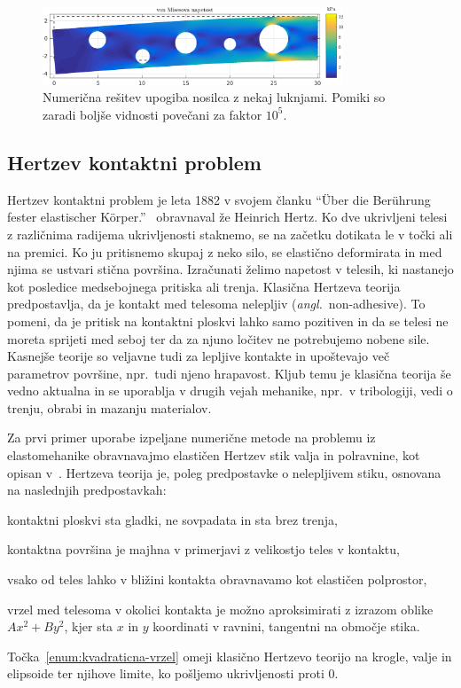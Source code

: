 \documentclass[12pt,a4paper,twoside]{article}
\newenvironment{enumerate*}{\vspace{-1.5\parskip}\begin{enumerate}\setlength{\itemsep}{0pt}\setlength{\parskip}{2pt}}{\end{enumerate}\vspace{-1\parskip}}
\theoremstyle{definition} %
\theoremstyle{plain} %
\numberwithin{equation}{section}
\newcommand{\ang}[1]{(\textit{angl.}\ #1)}
\begin{document}
\begin{figure}[h]
  \centering
  \includegraphics[width=0.8\textwidth]{images/cantilever_beam_with_holes.png}
  \caption[Numerična rešitev upogiba nosilca z nekaj luknjami.]{Numerična
  rešitev upogiba nosilca z nekaj luknjami. Pomiki so zaradi boljše vidnosti
  povečani za faktor $10^5$.}
  \label{fig:cantilever-beam-with-holes}
\end{figure}

\subsection{Hertzev kontaktni problem}
\label{sec:hertz}
Hertzev kontaktni problem je leta 1882 v svojem članku ``{\"U}ber die Ber{\"u}hrung fester
elastischer K{\"o}rper.''~\cite{hertz1882beruhrung} obravnaval že Heinrich Hertz. Ko dve ukrivljeni
telesi z različnima radijema ukrivljenosti staknemo, se na začetku dotikata le v točki ali na
premici. Ko ju pritisnemo skupaj z neko silo, se elastično deformirata in med njima se ustvari
stična površina. Izračunati želimo napetost v telesih, ki nastanejo kot posledice medsebojnega
pritiska ali trenja. Klasična Hertzeva teorija predpostavlja, da je kontakt med telesoma nelepljiv
\ang{non-adhesive}. To pomeni, da je pritisk na kontaktni ploskvi lahko samo pozitiven in da se
telesi ne moreta sprijeti med seboj ter da za njuno ločitev ne potrebujemo nobene sile. Kasnejše
teorije so veljavne tudi za lepljive kontakte in upoštevajo več parametrov površine, npr.~tudi njeno
hrapavost. Kljub temu je klasična teorija še vedno aktualna in se uporablja v drugih vejah mehanike,
npr.~v tribologiji, vedi o trenju, obrabi in mazanju materialov.

Za prvi primer uporabe izpeljane numerične metode na problemu iz elastomehanike obravnavajmo
elastičen Hertzev stik valja in polravnine, kot opisan v~\cite[str.\ 122, poglavje 3.2]{williams2001contact}.
Hertzeva teorija je, poleg predpostavke o nelepljivem stiku, osnovana na naslednjih predpostavkah:
\begin{enumerate*}
  \item kontaktni ploskvi sta gladki, ne sovpadata in sta brez trenja,
  \item kontaktna površina je majhna v primerjavi z velikostjo teles v kontaktu,
  \item vsako od teles lahko v bližini kontakta obravnavamo kot elastičen polprostor,
  \item vrzel med telesoma v okolici kontakta je možno aproksimirati z izrazom oblike $Ax^2 + By^2$,
    kjer sta $x$ in $y$ koordinati v ravnini, tangentni na območje stika.
    \label{enum:kvadraticna-vrzel}
\end{enumerate*}
Točka~\ref{enum:kvadraticna-vrzel} omeji klasično Hertzevo teorijo na krogle, valje in elipsoide ter
njihove limite, ko pošljemo ukrivljenosti proti 0.
\end{document}
